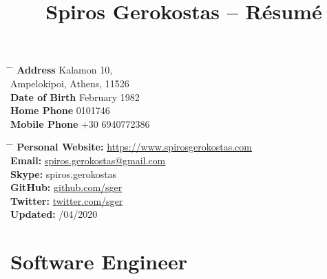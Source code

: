 \documentclass[10pt]{article}
\begin{document}
\title{Spiros Gerokostas -- Résumé} 


\parbox{0.5\textwidth}{ %
\begin{tabbing} %
\hspace{3cm} \= \hspace{4cm} \= \kill %
{\bf Address} \> Kalamon 10,\\ %
\> Ampelokipoi, Athens, 11526 \\ %
{\bf Date of Birth}  February 1982 \\ %
{\bf Home Phone}  0101746 \\ %
{\bf Mobile Phone} \>+30 6940772386 \\ %
\end{tabbing}}
\hfill %
\parbox{0.5\textwidth}{ %
\begin{tabbing} %
\hspace{3cm} \= \hspace{4cm} \= \kill %
{\bf Personal Website:} \>\href{https://www.spirosgerokostas.com}{https://www.spirosgerokostas.com} \\ %
{\bf Email:} \> \href{mailto:spiros.gerokostas@gmail.com}{spiros.gerokostas@gmail.com} \\ %
{\bf Skype:} \> spiros.gerokostas \\ %
{\bf GitHub:} \>\href{http://github.com/sger}{github.com/sger} \\ %
{\bf Twitter:} \>\href{http://twitter.com/sger}{twitter.com/sger} \\ %
{\bf Updated:} /04/2020 \\ %
\end{tabbing}}


\section{Software Engineer}

\end{document}
